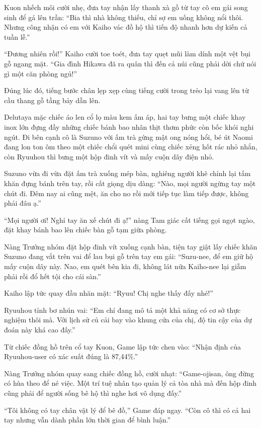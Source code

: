 ﻿\documentclass[../main.tex]{subfiles}
\begin{document}
Kuon nhếch môi cười nhẹ, đưa tay nhận lấy thanh xà gồ từ tay cô em gái song sinh để gá lên trần: ``Bia thì nhà không thiếu, chỉ sợ em uống không nổi thôi. Nhưng công nhận có em với Kaiho vác đồ hộ thì tiến độ nhanh hơn dự kiến cả tuần lễ.''

``Đương nhiên rồi!'' Kaiho cười toe toét, đưa tay quẹt mũi làm dính một vệt bụi gỗ ngang mặt. ``Gia đình Hikawa đã ra quân thì đến cả núi cũng phải dời chứ nói gì một căn phòng ngủ!''

Đúng lúc đó, tiếng bước chân lẹp xẹp cùng tiếng cười trong trẻo lại vang lên từ cầu thang gỗ tầng bảy dẫn lên.

Delutaya mặc chiếc áo len cổ lọ màu kem ấm áp, hai tay bưng một chiếc khay inox lớn đựng đầy những chiếc bánh bao nhân thịt thơm phức còn bốc khói nghi ngút. Đi bên cạnh cô là Suzuno với ấm trà gừng mật ong nóng hổi, bé út Naomi đang lon ton ôm theo một chiếc chổi quét mini cùng chiếc xẻng hốt rác nhỏ nhắn, còn Ryuuhou thì bưng một hộp đinh vít và mấy cuộn dây điện nhỏ.

Suzuno vừa đi vừa đặt ấm trà xuống mép bàn, nghiêng người khẽ chỉnh lại tấm khăn đựng bánh trên tay, rồi cất giọng dịu dàng: ``Nào, mọi người ngừng tay một chút đi. Đêm nay ai cũng mệt, ăn cho no rồi mới tiếp tục làm tiếp được, không phải đâu ạ.''

``Mọi người ơi! Nghỉ tay ăn xế chút đi ạ!'' nàng Tam giác cất tiếng gọi ngọt ngào, đặt khay bánh bao lên chiếc bàn gỗ tạm giữa phòng.

Nàng Trưởng nhóm đặt hộp đinh vít xuống cạnh bàn, tiện tay giật lấy chiếc khăn Suzuno đang vắt trên vai để lau bụi gỗ trên tay em gái: ``Suzu-nee, để em giữ hộ mấy cuộn dây này. Nao, em quét bên kia đi, không lát nữa Kaiho-nee lại giẫm phải rồi đổ hết tội cho cái sàn.''

Kaiho lập tức quay đầu nhăn mặt: ``Ryuu! Chị nghe thấy đấy nhé!''

Ryuuhou tỉnh bơ nhún vai: ``Em chỉ đang mô tả một khả năng có cơ sở thực nghiệm thôi mà. Với lịch sử củ cải bay vào khung cửa của chị, độ tin cậy của dự đoán này khá cao đấy.''

Từ chiếc đồng hồ trên cổ tay Kuon, Game lập tức chen vào: ``Nhận định của Ryuuhou-user có xác suất đúng là 87,44\%.''

Nàng Trưởng nhóm quay sang chiếc đồng hồ, cười nhạt: ``Game-ojisan, ông đừng có hùa theo để né việc. Một trí tuệ nhân tạo quản lý cả tòa nhà mà đến hộp đinh cũng phải để người sống bê hộ thì nghe hơi vô dụng đấy.''

``Tôi không có tay chân vật lý để bê đồ,'' Game đáp ngay. ``Còn cô thì có cả hai tay nhưng vẫn dành phần lớn thời gian để bình luận.''
\end{document}
